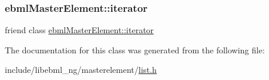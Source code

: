 \mbox{\label{classebml_1_1ebmlList_1_1__iterator_a7f678a46134f738b99dfff4aafa7fc5f}} 
\subsubsection{\texorpdfstring{ebml\+Master\+Element\+::iterator}{ebmlMasterElement::iterator}}
{\footnotesize\ttfamily friend class \mbox{\hyperlink{classebml_1_1ebmlMasterElement_1_1iterator}{ebml\+Master\+Element\+::iterator}}\hspace{0.3cm}{\ttfamily [friend]}}



The documentation for this class was generated from the following file\+:\begin{DoxyCompactItemize}
\item 
include/libebml\+\_\+ng/masterelement/\mbox{\hyperlink{list_8h}{list.\+h}}\end{DoxyCompactItemize}

